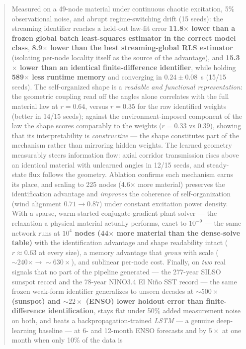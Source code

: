 \documentclass[10pt]{article}
\begin{document}
\begin{abstract}
Measured on a 49-node material under continuous chaotic excitation, 5\% observational
noise, and abrupt regime-switching drift (15 seeds): the streaming identifier reaches a
held-out law-fit error \textbf{11.8$\times$ lower than a frozen global batch
least-squares estimator in the correct model class}, \textbf{8.9$\times$ lower than the
best streaming-global RLS estimator} (isolating per-node locality itself as the source
of the advantage), and \textbf{15.3$\times$ lower than an identical finite-difference
identifier}, while holding \textbf{589$\times$ less runtime memory} and converging in
$0.24 \pm 0.08$~s (15/15 seeds). The self-organized shape is a \emph{readable and
functional representation}: the geometric coupling read off the angles alone correlates
with the full material law at $r = 0.64$, versus $r = 0.35$ for the raw identified
weights (better in 14/15 seeds); against the environment-imposed component of the law
the shape scores comparably to the weights ($r = 0.33$ vs $0.39$), showing that its
interpretability is \emph{constructive} --- the shape constitutes part of the mechanism
rather than mirroring hidden weights. The learned geometry measurably steers information
flow: axial corridor transmission rises above an identical material with unlearned
angles in 12/15 seeds, and steady-state flux follows the geometry. Ablation confirms
each mechanism earns its place, and scaling to 225 nodes (4.6$\times$ more material)
preserves the identification advantage and \emph{improves} the coherence of
self-organization (wind alignment $0.71 \to 0.87$) under constant excitation power
density. With a sparse, warm-started conjugate-gradient plant solver --- the
relaxation a physical material actually performs, exact to $10^{-9}$ --- the same
network runs at \textbf{$10^4$ nodes (44$\times$ more material than the
dense-solve table)} with the identification advantage and shape readability intact
($r \approx 0.63$ at every size), a memory advantage that \emph{grows} with scale
(${\sim}240\times \to {\sim}630\times$), and sublinear per-node cost. Finally, on
\emph{two} real signals that no part of the pipeline generated --- the 277-year
SILSO sunspot record and the 78-year NINO3.4 El Ni\~no SST record --- the same
frozen weak-form identifier generalizes to unseen decades at \textbf{${\sim}500\times$
(sunspot) and ${\sim}22\times$ (ENSO) lower holdout error than finite-difference
identification}, stays flat under 50\% added measurement noise on both, and beats a
backpropagation-trained \emph{LSTM} --- a genuine deep-learning baseline --- at 6- and
12-month ENSO forecasts and by $5\times$ at one month when only 10\% of the data is

\end{abstract}
\end{document}
